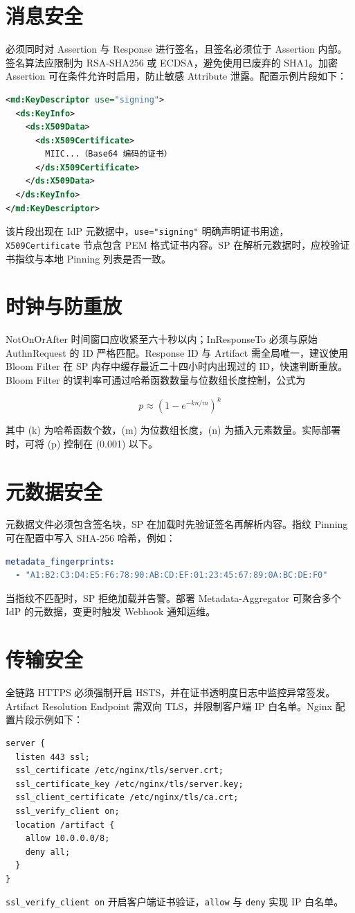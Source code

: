 \section{消息安全}
必须同时对 Assertion 与 Response 进行签名，且签名必须位于 Assertion 内部。签名算法应限制为 RSA-SHA256 或 ECDSA，避免使用已废弃的 SHA1。加密 Assertion 可在条件允许时启用，防止敏感 Attribute 泄露。配置示例片段如下：\par
\begin{lstlisting}[language=xml]
<md:KeyDescriptor use="signing">
  <ds:KeyInfo>
    <ds:X509Data>
      <ds:X509Certificate>
        MIIC...（Base64 编码的证书）
      </ds:X509Certificate>
    </ds:X509Data>
  </ds:KeyInfo>
</md:KeyDescriptor>
\end{lstlisting}
该片段出现在 IdP 元数据中，\texttt{use="signing"} 明确声明证书用途，\texttt{X509Certificate} 节点包含 PEM 格式证书内容。SP 在解析元数据时，应校验证书指纹与本地 Pinning 列表是否一致。\par
\section{时钟与防重放}
NotOnOrAfter 时间窗口应收紧至六十秒以内；InResponseTo 必须与原始 AuthnRequest 的 ID 严格匹配。Response ID 与 Artifact 需全局唯一，建议使用 Bloom Filter 在 SP 内存中缓存最近二十四小时内出现过的 ID，快速判断重放。Bloom Filter 的误判率可通过哈希函数数量与位数组长度控制，公式为\par
$$ p \approx (1 - e^{-kn/m})^k $$\par
其中 (k) 为哈希函数个数，(m) 为位数组长度，(n) 为插入元素数量。实际部署时，可将 (p) 控制在 (0.001) 以下。\par
\section{元数据安全}
元数据文件必须包含签名块，SP 在加载时先验证签名再解析内容。指纹 Pinning 可在配置中写入 SHA-256 哈希，例如：\par
\begin{lstlisting}[language=yaml]
metadata_fingerprints:
  - "A1:B2:C3:D4:E5:F6:78:90:AB:CD:EF:01:23:45:67:89:0A:BC:DE:F0"
\end{lstlisting}
当指纹不匹配时，SP 拒绝加载并告警。部署 Metadata-Aggregator 可聚合多个 IdP 的元数据，变更时触发 Webhook 通知运维。\par
\section{传输安全}
全链路 HTTPS 必须强制开启 HSTS，并在证书透明度日志中监控异常签发。Artifact Resolution Endpoint 需双向 TLS，并限制客户端 IP 白名单。Nginx 配置片段示例如下：\par
\begin{lstlisting}[language=nginx]
server {
  listen 443 ssl;
  ssl_certificate /etc/nginx/tls/server.crt;
  ssl_certificate_key /etc/nginx/tls/server.key;
  ssl_client_certificate /etc/nginx/tls/ca.crt;
  ssl_verify_client on;
  location /artifact {
    allow 10.0.0.0/8;
    deny all;
  }
}
\end{lstlisting}
\texttt{ssl\_{}verify\_{}client on} 开启客户端证书验证，\texttt{allow} 与 \texttt{deny} 实现 IP 白名单。\par
